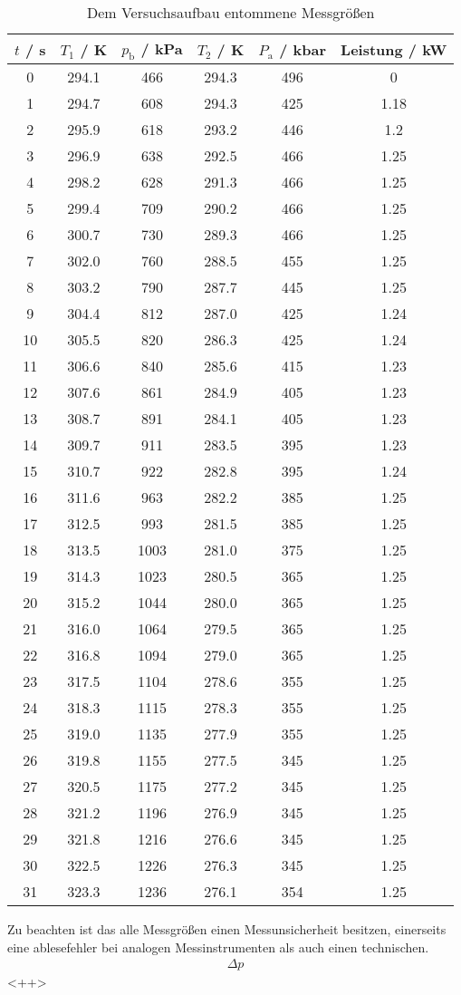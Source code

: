 \begin{table}
  \centering
  \begin{tabular}{c c c c c c}
    \toprule
    $t$ / s & $T_{\text{1}}$ / K & $p_{\text{b}}$ / kPa & $T_{2}$ / K & $P_{\text{a}}$ / kbar & Leistung / kW \\
    \midrule
    0 	& 294.1 & 466	& 294.3	& 496	& 0	\\
    1 	& 294.7 & 608	& 294.3	& 425	& 1.18	\\
    2 	& 295.9 & 618	& 293.2	& 446	& 1.2	\\
    3 	& 296.9 & 638	& 292.5	& 466	& 1.25	\\
    4	& 298.2	& 628	& 291.3	& 466	& 1.25	\\
    5	& 299.4 & 709	& 290.2	& 466	& 1.25	\\
    6	& 300.7 & 730	& 289.3	& 466	& 1.25	\\
    7	& 302.0 & 760	& 288.5	& 455	& 1.25	\\
    8	& 303.2	& 790	& 287.7	& 445	& 1.25	\\
    9	& 304.4 & 812	& 287.0	& 425	& 1.24	\\
    10	& 305.5 & 820	& 286.3	& 425	& 1.24	\\
    11 	& 306.6 & 840	& 285.6	& 415	& 1.23	\\
    12	& 307.6	& 861	& 284.9	& 405	& 1.23	\\	
    13	& 308.7 & 891	& 284.1	& 405	& 1.23	\\	
    14 	& 309.7 & 911	& 283.5	& 395	& 1.23	\\
    15 	& 310.7 & 922	& 282.8	& 395	& 1.24	\\
    16 	& 311.6	& 963	& 282.2	& 385	& 1.25	\\
    17	& 312.5	& 993	& 281.5	& 385	& 1.25	\\
    18	& 313.5	& 1003	& 281.0	& 375	& 1.25	\\
    19	& 314.3	& 1023	& 280.5	& 365	& 1.25	\\
    20	& 315.2	& 1044	& 280.0	& 365	& 1.25	\\
    21	& 316.0	& 1064	& 279.5	& 365	& 1.25	\\
    22	& 316.8	& 1094	& 279.0	& 365	& 1.25	\\
    23	& 317.5	& 1104	& 278.6	& 355	& 1.25	\\
    24	& 318.3	& 1115	& 278.3	& 355	& 1.25	\\
    25	& 319.0	& 1135	& 277.9	& 355	& 1.25	\\
    26	& 319.8	& 1155	& 277.5	& 345	& 1.25	\\
    27	& 320.5	& 1175	& 277.2	& 345	& 1.25	\\
    28	& 321.2	& 1196	& 276.9	& 345	& 1.25	\\
    29	& 321.8	& 1216	& 276.6	& 345	& 1.25	\\
    30	& 322.5	& 1226	& 276.3	& 345	& 1.25	\\
    31	& 323.3	& 1236	& 276.1	& 354	& 1.25	\\
  \end{tabular}
  \caption{Dem Versuchsaufbau entommene Messgrößen}
  \label{tab:Daten}
\end{table}

Zu beachten ist das alle Messgrößen einen Messunsicherheit besitzen, einerseits eine ablesefehler bei analogen Messinstrumenten als auch einen technischen.
\begin{eqnarray*}
  \Delta p
\end{eqnarray*}<++>
